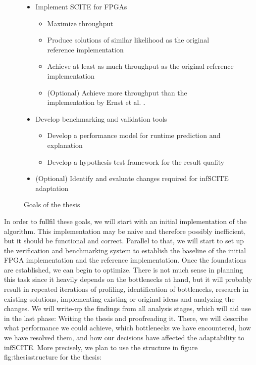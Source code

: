 \begin{figure}
    \begin{itemize}
        \item Implement \ac{SCITE} for \acp{FPGA}
        \begin{itemize}
            \item Maximize throughput
            \item Produce solutions of similar likelihood as the original reference implementation
            \item Achieve at least as much throughput as the original reference implementation
            \item (Optional) Achieve more throughput than the implementation by Ernst et al. \cite{ernst2020Performance}.
        \end{itemize}
        \item Develop benchmarking and validation tools
        \begin{itemize}
            \item Develop a performance model for runtime prediction and explanation
            \item Develop a hypothesis test framework for the result quality
        \end{itemize}
        \item (Optional) Identify and evaluate changes required for \ac{infSCITE} adaptation
    \end{itemize}

    \centering
    \caption{Goals of the thesis}
    \label{fig:goals}
\end{figure}

In order to fullfil these goals, we will start with an initial implementation of the algorithm. This implementation may be naive and therefore possibly inefficient, but it should be functional and correct. Parallel to that, we will start to set up the verification and benchmarking system to establish the baseline of the initial FPGA implementation and the reference implementation. Once the foundations are established, we can begin to optimize. There is not much sense in planning this task since it heavily depends on the bottlenecks at hand, but it will probably result in repeated iterations of profiling, identification of bottlenecks, research in existing solutions, implementing existing or original ideas and analyzing the changes. We will write-up the findings from all analysis stages, which will aid use in the last phase: Writing the thesis and proofreading it. There, we will describe what performance we could achieve, which bottlenecks we have encountered, how we have resolved them, and how our decisions have affected the adaptability to \ac{infSCITE}. More precisely, we plan to use the structure in figure \refname{fig:thesisstructure} for the thesis:


